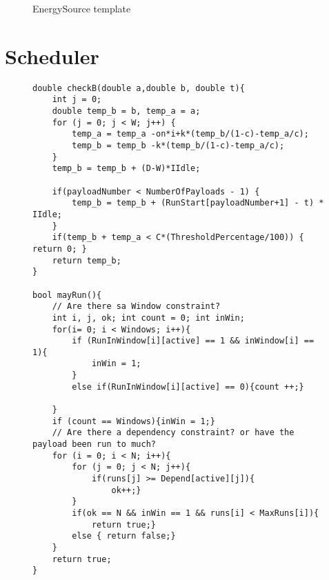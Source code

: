 \begin{figure}[H]
	\centering
	\caption{EnergySource template}
	\label{fig:smc_ES}
\end{figure}

\section{Scheduler}
\begin{figure}[H]
	\begin{lstlisting}[language=my_c, caption={Declarations for Scheduler template}, label=lst:scheduler_code]
double checkB(double a,double b, double t){
	int j = 0;
	double temp_b = b, temp_a = a;
	for (j = 0; j < W; j++) {
		temp_a = temp_a -on*i+k*(temp_b/(1-c)-temp_a/c);
		temp_b = temp_b -k*(temp_b/(1-c)-temp_a/c);
	}
	temp_b = temp_b + (D-W)*IIdle;
	
	if(payloadNumber < NumberOfPayloads - 1) {
		temp_b = temp_b + (RunStart[payloadNumber+1] - t) * IIdle;
	}
	if(temp_b + temp_a < C*(ThresholdPercentage/100)) { return 0; }
	return temp_b;
}

bool mayRun(){
	// Are there sa Window constraint?
	int i, j, ok; int count = 0; int inWin;
	for(i= 0; i < Windows; i++){
		if (RunInWindow[i][active] == 1 && inWindow[i] == 1){
			inWin = 1;
		}
		else if(RunInWindow[i][active] == 0){count ++;}
		
	}
	if (count == Windows){inWin = 1;}
	// Are there a dependency constraint? or have the payload been run to much?
	for (i = 0; i < N; i++){
		for (j = 0; j < N; j++){
			if(runs[j] >= Depend[active][j]){
				ok++;}
		}
		if(ok == N && inWin == 1 && runs[i] < MaxRuns[i]){
			return true;}
		else { return false;}
	}
	return true;
}
	\end{lstlisting}
\end{figure}

